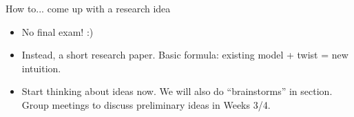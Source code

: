 \documentclass[aspectratio=169]{beamer}
\begin{document}
\begin{frame}{How to... come up with a research idea}

\Large
\begin{itemize}

\item No final exam! :)
\pause 
\item Instead, a short research paper. Basic formula: existing model + twist = new intuition.
\pause 
\item Start thinking about ideas now. We will also do ``brainstorms'' in section. Group meetings to discuss preliminary ideas in Weeks 3/4.


\end{itemize} 
\end{frame}
\end{document}
